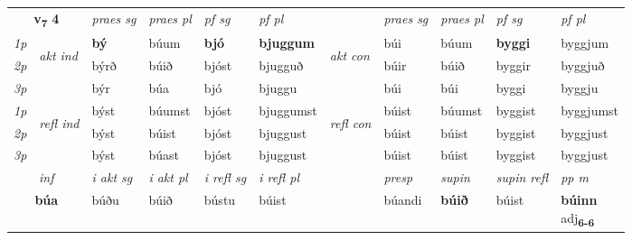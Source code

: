 \noindent
\begin{tabular}{lllllllllll} \toprule
\multicolumn{2}{c}{\textbf{v{\textsubscript{7}}} \Large{\textbf{4}}}  &  \textit{praes sg}  & \textit{praes pl}  &\textit{ pf sg} & \textit{pf pl} &  &  \textit{praes sg}  & \textit{praes pl}  & \textit{pf sg} & \textit{pf pl } \\*
	\cmidrule{3-6} \cmidrule{8-11}
 {\textit{1p}} & \multirow{3}{*}{\begin{turn}{90}\textit{akt ind}\end{turn}} & \textbf{bý} & búum & \textbf{bjó} & \textbf{bjuggum} & \multirow{3}{*}{\begin{turn}{90}\textit{akt con}\end{turn}} &búi & búum & \textbf{byggi} & byggjum\\*
 {\textit{2p}} &  &  býrð  & búið & bjóst & bjugguð & & búir & búið & byggir & byggjuð \\*
{\textit{3p}} &  & býr & búa & bjó & bjuggu & & búi & búi& byggi & byggju \\*
\cmidrule{3-6} \cmidrule{8-11}
 {\textit{1p}} & \multirow{3}{*}{\begin{turn}{90}\textit{refl ind}\end{turn}}  & býst & búumst & bjóst & bjuggumst & \multirow{3}{*}{\begin{turn}{90}\textit{refl con}\end{turn}}  &búist & búumst & byggist & byggjumst \\*
 {\textit{2p}} &  & býst & búist & bjóst & bjuggust & &búist & búist & byggist & byggjust \\*
 {\textit{3p}}  & & býst & búast & bjóst & bjuggust & & búist & búist& byggist & byggjust \\*
\cmidrule{3-6} \cmidrule{8-11}

   \multicolumn{2}{c}{\textit{inf}}  & \textit{i akt sg} & \textit{i akt pl} & \textit{i refl sg} & \textit{i refl pl} && \textit{presp} & \textit{supin} & \textit{supin refl} & \textit{pp m} \\*
  \multicolumn{2}{c}{\textbf{búa}} & búðu  & búið & bústu & búist && búandi &  \textbf{búið} & búist & \specialcell{\textbf{búinn} \\ adj\textbf{\textsubscript{6-6}}} \\*
\end{tabular}

